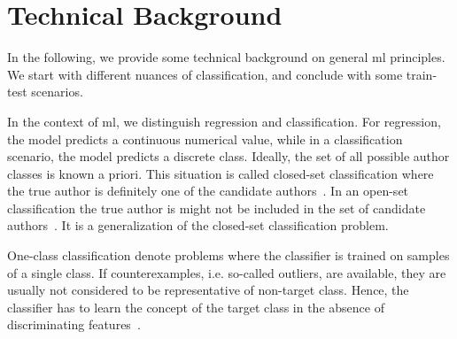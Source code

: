 \section{Technical Background}

In the following, we provide some technical background on general \ac{ml} principles.
We start with different nuances of classification, and conclude with some train-test scenarios.

In the context of \ac{ml}, we distinguish regression and classification.
For regression, the model predicts a continuous numerical value, while in a classification scenario, the model predicts a discrete class.
Ideally, the set of all possible author classes is known a priori.
This situation is called closed-set classification where the true author is definitely one of the candidate authors~\citep{stamatatos_survey_2009,koppel_authorship_2011,barlas_cross_domain_2020,boenninghoff_o2d2_2021,neal_surveying_2018}.
In an open-set classification the true author is might not be included in the set of candidate authors~\citep{stamatatos_survey_2009,barlas_cross_domain_2020,neal_surveying_2018}.
It is a generalization of the closed-set classification problem.

One-class classification denote problems where the classifier is trained on samples of a single class.
If counterexamples, i.e. so-called outliers, are available, they are usually not considered to be representative of non-target class.
Hence, the classifier has to learn the concept of the target class in the absence of discriminating features~\citep{stein_intrinsic_2011,koppel_authorship_2004}.



